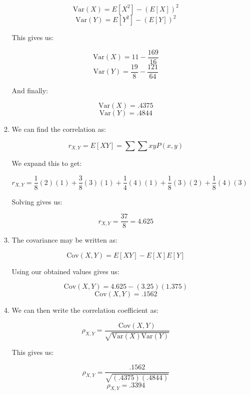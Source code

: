 \begin{enumerate}
\begin{enumerate}
        $$\text{Var}(X)=E[X^2]-(E[X])^2$$
        $$\text{Var}(Y)=E[Y^2]-(E[Y])^2$$

        This gives us:

        $$\text{Var}(X)=11-\frac{169}{16}$$
        $$\text{Var}(Y)=\frac{19}{8}-\frac{121}{64}$$

        And finally:

        $$\boxed{\text{Var}(X)=.4375}$$
        $$\boxed{\text{Var}(Y)=.4844}$$

      \item We can find the correlation as:

        $$r_{X,Y}=E[XY]=\sum\sum xyP(x,y)$$

        We expand this to get:

        $$r_{X,Y}=\frac{1}{8}(2)(1)+\frac{3}{8}(3)(1)+\frac{1}{4}(4)(1)+\frac{1}{8}(3)(2)+\frac{1}{8}(4)(3)$$

        Solving gives us:

        $$\boxed{r_{X,Y}=\frac{37}{8}=4.625}$$

      \item The covariance may be written as:

        $$\text{Cov}(X,Y)=E[XY]-E[X]E[Y]$$

        Using our obtained values gives us:

        $$\text{Cov}(X,Y)=4.625-\left( 3.25 \right)(1.375)$$
        $$\boxed{\text{Cov}(X,Y)=.1562}$$

      \item We can then write the correlation coefficient as:

        $$\rho_{X,Y}=\frac{\text{Cov}(X,Y)}{\sqrt{\text{Var}(X)\text{Var}(Y)}}$$

        This gives us:

        $$\rho_{X,Y}=\frac{.1562}{\sqrt{(.4375)(.4844)}}$$
        $$\boxed{\rho_{X,Y}=.3394}$$

    \end{enumerate}

\end{enumerate}



